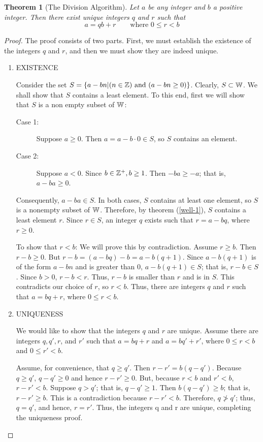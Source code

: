 \documentclass[12pt]{article}
\newtheorem{thm}{Theorem}[section]
\theoremstyle{definition}
\theoremstyle{plain}
\theoremstyle{remark}
\begin{document}
\begin{thm}[The Division Algorithm]
Let $a$ be any integer and $b$ a positive integer. Then there exist unique integers $q$ and $r$ such that                                                                      \[a=qb+r\qquad  \mbox{where } 0\leq r<b\]
\end{thm}
\begin{proof}
The proof consists of two parts. First, we must establish the existence of the integers $q$ and $r$, and then we must show they are indeed unique.
\begin{enumerate}
  \item EXISTENCE 
  
  \noindent Consider the set $S=\{a-bn|(n\in \Bbb Z) \mbox{ and } (a-bn\geq 0)\}$. Clearly, $S\subset \Bbb W$. We shall show that $S$ contains a least element. To this end, first we will show that $S$ is a non empty subset of $\Bbb W$:
  \begin{description}
    \item[Case 1:] Suppose $a\ge 0$. Then $a=a-b\cdot 0\in S$, so $S$ contains an element.
    \item[Case 2:] Suppose $a<0$. Since $b\in \Bbb Z^+, b\geq 1$. Then $-ba\geq -a$; that is, $a-ba\geq 0$.
  \end{description}
  Consequently, $a-ba\in S$. In both cases, $S$ contains at least one element, so $S$ is a nonempty subset of $\Bbb W$. Therefore, by theorem (\ref{well-1}), $S$ contains a least element $r$. Since $r\in S$, an integer $q$ exists such that $r=a-bq$, where $r\ge 0$.
  
  \noindent To show that  $r<b$: We will prove this by contradiction. Assume $r\geq b$. Then $r-b\geq 0$. But $r-b=(a-bq)-b=a-b(q+1)$. Since $a-b(q+1)$ is of the form $a-bn$ and is greater than $0$, $a-b(q+1)\in S$; that is, $r-b\in S$. Since $b>0$, $r-b<r$. Thus, $r-b$ is smaller than $r$ and is in $S$. This contradicts our choice of $r$, so $r<b$. Thus, there are integers $q$ and $r$ such that $a=bq+r$, where $0\leq r<b$.
  
  \item UNIQUENESS 
  
  \noindent We would like to show that the integers $q$ and $r$ are unique. Assume there are integers $q,q',r$, and $r'$ such that $a=bq+r$ and $a=bq'+r'$, where $0\leq r<b$ and $0\leq r'<b$. 
  
  \noindent Assume, for convenience, that $q\geq q'$. Then $r-r'=b(q-q')$. Because $q\geq q'$, $q-q'\geq 0$ and hence $r-r'\geq 0$. But, because $r<b$ and $r'<b$, $r-r'<b$. Suppose $q>q'$; that is, $q-q'\geq 1$. Then $b(q-q')\geq b$; that is, $r-r'\geq b$. This is a contradiction because $r-r'<b$. Therefore, $q\ngtr q'$; thus, $q=q'$, and hence, $r=r'$. Thus, the integers q and r are unique, completing the uniqueness proof.
\end{enumerate}
\end{proof}
\end{document}
